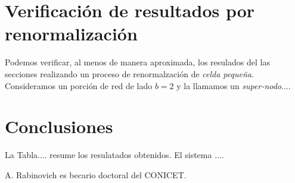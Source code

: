 \documentclass[%
 reprint,
 amsmath,amssymb,
 aps,
spanish]{revtex4-1}
\begin{document}
\section{\label{R} Verificaci\'on de resultados por renormalizaci\'on}

Podemos verificar, al menos de manera aproximada, los resulados del las secciones realizando un proceso de renormalzaci\'on de \emph{celda peque\~na}. Consideramos un porci\'on de red de lado $b=2$ y la llamamos un \emph{super-nodo}....

\section{\label{conclusions}Conclusiones}

La Tabla.... resume los resulatados obtenidos. El sistema ....


\begin{acknowledgments}
A. Rabinovich es becario doctoral del CONICET. 
\end{acknowledgments}

\appendix
\end{document}
